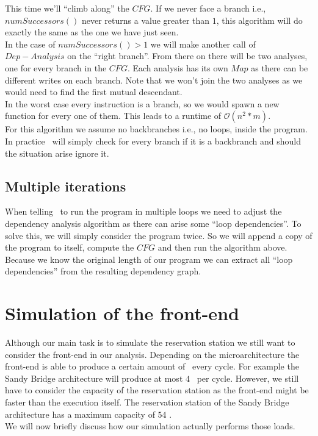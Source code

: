 This time we'll ``climb along'' the $CFG$. If we never face a branch i.e., $numSuccessors()$ never returns a value greater than $1$, this algorithm will do exactly the same as the one we have just seen.\\
In the case of $numSuccessors() > 1$ we will make another call of $Dep-Analysis$ on the ``right branch''. From there on there will be two analyses, one for every branch in the $CFG$. Each analysis has its own $Map$ as there can be different writes on each branch. Note that we won't join the two analyses as we would need to find the first mutual descendant.\\
In the worst case every instruction is a branch, so we would spawn a new function for every one of them. This leads to a runtime of $\mathcal{O}(n^2*m)$.\\
For this algorithm we assume no backbranches i.e., no loops, inside the program. In practice \suaca\ will simply check for every branch if it is a backbranch and should the situation arise ignore it.


\subsection{Multiple iterations}

When telling \suaca\ to run the program in multiple loops we need to adjust the dependency analysis algorithm as there can arise some ``loop dependencies''. To solve this, we will simply consider the program twice. So we will append a copy of the program to itself, compute the $CFG$ and then run the algorithm above. Because we know the original length of our program we can extract all ``loop dependencies'' from the resulting dependency graph.


\section{Simulation of the front-end}
\label{sec:simfrontend}

Although our main task is to simulate the reservation station we still want to consider the front-end in our analysis. Depending on the microarchitecture the front-end is able to produce a certain amount of \microops\ every cycle. For example the Sandy Bridge architecture will produce at most $4$ \microops\ per cycle. However, we still have to consider the capacity of the reservation station as the front-end might be faster than the execution itself. The reservation station of the Sandy Bridge architecture has a maximum capacity of $54$ \microops.\\
We will now briefly discuss how our simulation actually performs those loads.\newpage

